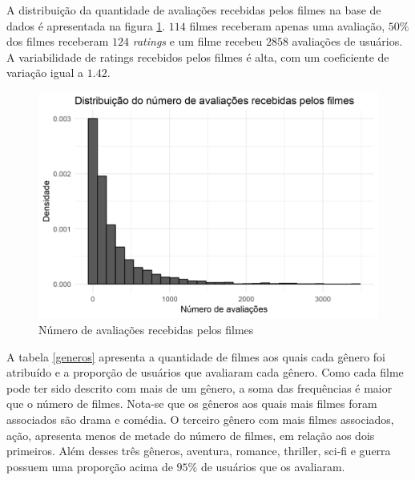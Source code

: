 \documentclass[12pt,a4paper,header]{abnt}
\begin{document}
A distribuição da quantidade de avaliações recebidas pelos filmes na base de dados é apresentada na figura \ref{filmes_ratings}. $114$ filmes receberam apenas uma avaliação, $50\%$ dos filmes receberam $124$ \textit{ratings} e um filme recebeu $2858$ avaliações de usuários. A variabilidade de ratings recebidos pelos filmes é alta, com um coeficiente de variação igual a $1.42$.

\begin{figure}[h]
\centering
\includegraphics[]{../R/img/ratings_filmes.png}
\caption{Número de avaliações recebidas pelos filmes}
\label{filmes_ratings}
\end{figure}

A tabela \ref{generos} apresenta a quantidade de filmes aos quais cada gênero foi atribuído e a proporção de usuários que avaliaram cada gênero. Como cada filme pode ter sido descrito com mais de um gênero, a soma das frequências é maior que o número de filmes. Nota-se que os gêneros aos quais mais filmes foram associados são drama e comédia. O terceiro gênero com mais filmes associados, ação, apresenta menos de metade do número de filmes, em relação aos dois primeiros. Além desses três gêneros, aventura, romance, thriller, sci-fi e guerra possuem uma proporção acima de $95\%$ de usuários que os avaliaram.
\end{document}
